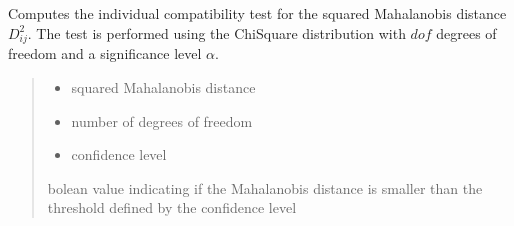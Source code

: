 \documentclass[letterpaper,10pt,english]{sphinxmanual}
\begin{document}
\begin{fulllineitems}
\begin{fulllineitems}
\label{\detokenize{FEKFMBLocalization:FEKFMBL.FEKFMBL.IndividualCompatibility}}
\pysigstartsignatures
{}
\pysigstopsignatures
\sphinxAtStartPar
Computes the individual compatibility test for the squared Mahalanobis distance \(D^2_{ij}\). The test is performed using the Chi\sphinxhyphen{}Square distribution with \(dof\) degrees of freedom and a significance level \(\alpha\).
\begin{quote}\begin{description}
\begin{itemize}
\item {} 
\sphinxAtStartPar
{} \textendash{} squared Mahalanobis distance

\item {} 
\sphinxAtStartPar
{} \textendash{} number of degrees of freedom

\item {} 
\sphinxAtStartPar
{} \textendash{} confidence level

\end{itemize}

\sphinxAtStartPar
bolean value indicating if the Mahalanobis distance is smaller than the threshold defined by the confidence level

\end{description}\end{quote}

\end{fulllineitems}



\end{fulllineitems}
\end{document}
